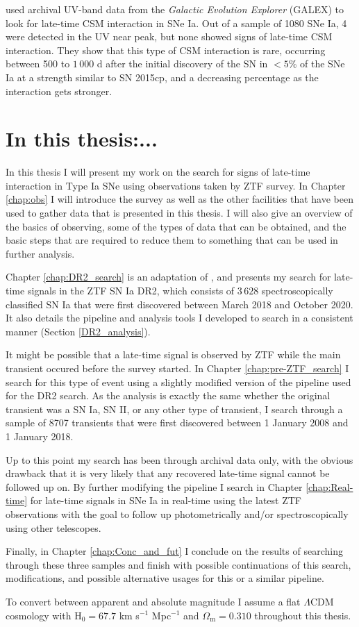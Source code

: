 \documentclass[a4paper,oneside,12pt, class=Latex/Classes/PhDthesisPSnPDF, crop=false]{standalone}
\begin{document}
\citet{GALEX_Late_CSM} used archival UV-band data from the \textit{Galactic Evolution Explorer} (GALEX) to look for late-time CSM interaction in SNe Ia. Out of a sample of 1080 SNe Ia, 4 were detected in the UV near peak, but none showed signs of late-time CSM interaction. They show that this type of CSM interaction is rare, occurring between 500 to $1\,000$ d after the initial discovery of the SN in $<5$\% of the SNe Ia at a strength similar to SN 2015cp, and a decreasing percentage as the interaction gets stronger.



\section{In this thesis:...}
In this thesis I will present my work on the search for signs of late-time interaction in Type Ia SNe using observations taken by ZTF survey. In Chapter \ref{chap:obs} I will introduce the survey as well as the other facilities that have been used to gather data that is presented in this thesis. I will also give an overview of the basics of observing, some of the types of data that can be obtained, and the basic steps that are required to reduce them to something that can be used in further analysis.

Chapter \ref{chap:DR2_search} is an adaptation of \cite{Terwel_2024_paper1}, and presents my search for late-time signals in the ZTF SN Ia DR2, which consists of $3\,628$ spectroscopically classified SN Ia that were first discovered between March 2018 and October 2020. It also details the pipeline and analysis tools I developed to search in a consistent manner (Section \ref{DR2_analysis}).

It might be possible that a late-time signal is observed by ZTF while the main transient occured before the survey started. In Chapter \ref{chap:pre-ZTF_search} I search for this type of event using a slightly modified version of the pipeline used for the DR2 search. As the analysis is exactly the same whether the original transient was a SN Ia, SN II, or any other type of transient, I search through a sample of 8707 transients that were first discovered between 1 January 2008 and 1 January 2018.

Up to this point my search has been through archival data only, with the obvious drawback that it is very likely that any recovered late-time signal cannot be followed up on. By further modifying the pipeline I search in Chapter \ref{chap:Real-time} for late-time signals in SNe Ia in real-time using the latest ZTF observations with the goal to follow up photometrically and/or spectroscopically using other telescopes.

Finally, in Chapter \ref{chap:Conc_and_fut} I conclude on the results of searching through these three samples and finish with possible continuations of this search, modifications, and possible alternative usages for this or a similar pipeline.

To convert between apparent and absolute magnitude I assume a flat $\Lambda$CDM cosmology with H$_0 = 67.7$ km s$^{-1}$ Mpc$^{-1}$ and $\Omega_\text{m} = 0.310$ \citep{Planck18VI} throughout this thesis. %
\end{document}
